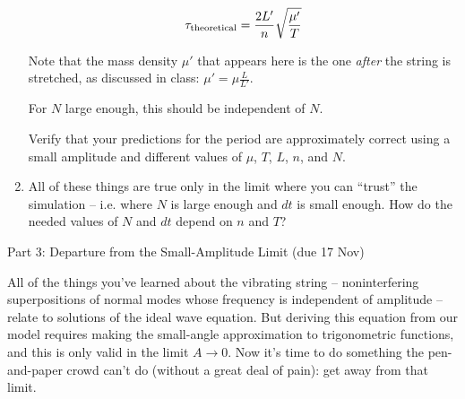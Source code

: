 \documentclass[12pt]{article}
\begin{document}
\begin{enumerate}
$$
\tau_{\rm theoretical} = \frac{2L'}{n} \sqrt{\frac{\mu'}{T}}
$$

Note that the mass density $\mu'$ that appears here is the one {\it after} the string is stretched, as discussed in class: $\mu' = \mu \frac{L}{L'}$.

For $N$ large enough, this should be independent of $N$. 

Verify that your predictions for the period are approximately correct using a small amplitude and different values of $\mu$, $T$, $L$, $n$, and $N$. 

\item All of these things are true only in the limit where you can ``trust'' the simulation -- i.e. where $N$ is large enough and $dt$ is small enough. How do the needed
values of $N$ and $dt$ depend on $n$ and $T$?

\end{enumerate}

\begin{center}\large Part 3: Departure from the Small-Amplitude Limit (due 17 Nov)\end{center}

All of the things you've learned about the vibrating string -- noninterfering superpositions of normal modes whose frequency is independent of amplitude -- relate to solutions of the ideal wave equation. But deriving this equation from our model requires making the small-angle approximation to trigonometric functions, and this is only valid in the limit $A \rightarrow 0$. Now it's time to do something the pen-and-paper crowd can't do (without a great deal of pain): get away from that limit.
\end{document}
